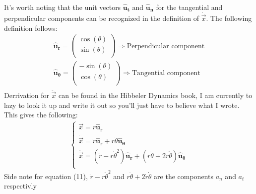\documentclass[11pt, a4paper]{article}
\begin{document}
It's worth noting that the unit vectors $\boldsymbol{\hat{u}_t}$ and $\boldsymbol{\hat{u}_n}$ for the tangential and perpendicular
components can be recognized in the definition of $\dot{\vec{x}}$. The following definition follows:
\begin{gather}
\boldsymbol{\hat{u}_r} = \begin{pmatrix} \cos(\theta) \\ \sin(\theta)\\ \end{pmatrix} \Rightarrow \text{Perpendicular component}\\
    \boldsymbol{\hat{u}_\theta} = \begin{pmatrix} -\sin(\theta) \\ \cos(\theta)\\ \end{pmatrix} \Rightarrow \text{Tangential component}\\
\end{gather}
Derrivation for $\ddot{\vec{x}}$ can be found in the Hibbeler Dynamics book, I am currently to lazy to look it up and write it out
so you'll just have to believe what I wrote. This gives the following:
\begin{align}
    \begin{cases}
        \vec{x} = r\boldsymbol{\hat{u}_r}\\
        \dot{\vec{x}} = \dot{r}\boldsymbol{\hat{u}_r} + r\dot{\theta}\boldsymbol{\hat{u}_\theta}\\
        \ddot{\vec{x}} = (\ddot{r} - r\dot{\theta}^2)\boldsymbol{\hat{u}_r} + (r\ddot{\theta} + 2\dot{r}\dot{\theta})\boldsymbol{\hat{u}_\theta}\\
    \end{cases}
\end{align}
Side note for equation (11), $\ddot{r} - r\dot{\theta}^2$ and $r\ddot{\theta} + 2\dot{r}\dot{\theta}$ are the components $a_n$ and $a_t$ respectivly
\end{document}
